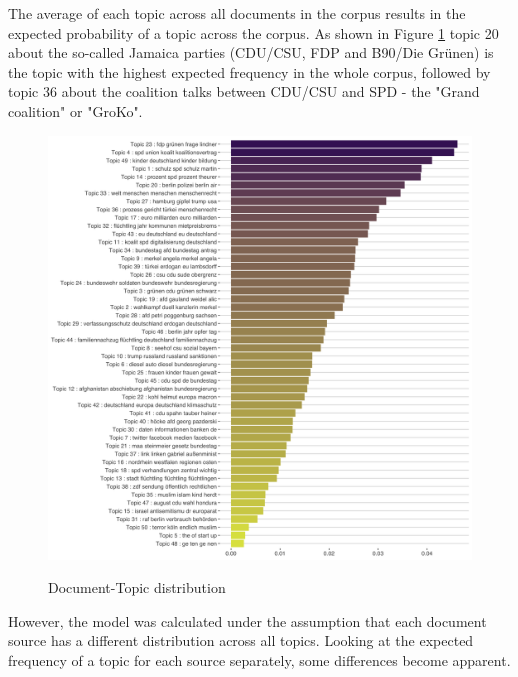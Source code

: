 \documentclass[12pt,a4paper,notitlepage]{article}
\begin{document}
The average of each topic across all documents in the corpus results in the expected probability of a topic across the corpus. As shown in Figure \ref{fig_expected_freq} topic 20 about the so-called Jamaica parties (CDU/CSU, FDP and B90/Die Grünen) is the topic with the highest expected frequency in the whole corpus, followed by topic 36 about the coalition talks between CDU/CSU and SPD - the "Grand coalition" or "GroKo".

\begin{figure}[H]
\begin{center}
	\caption{Document-Topic distribution}
	\includegraphics[width=\textwidth]{../figs/topic_proportion}
	\label{fig_expected_freq}
	\end{center}
\end{figure}

However, the model was calculated under the assumption that each document source has a different distribution across all topics. Looking at the expected frequency of a topic for each source separately, some differences become apparent.
\end{document}

